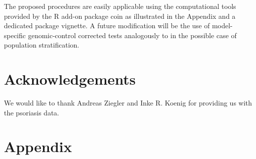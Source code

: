 \documentclass[bimj,fleqn]{w-art}
\newcommand{\Rpackage}[1]{{\normalfont\fontseries{b}\selectfont #1}}
\begin{document}
The proposed procedures are easily 
applicable using the computational tools provided by the \textsf{R} 
add-on package \Rpackage{coin} as illustrated in the Appendix 
and a dedicated package vignette. A future modification will be 
the use of model-specific genomic-control corrected tests 
analogously to \citet{Zang:2007} in the possible case of 
population stratification.

\section{Acknowledgements} 
We would like to thank Andreas Ziegler and Inke R. Koenig for providing 
us with the psoriasis data.




\newpage

\section*{Appendix}
\end{document}
